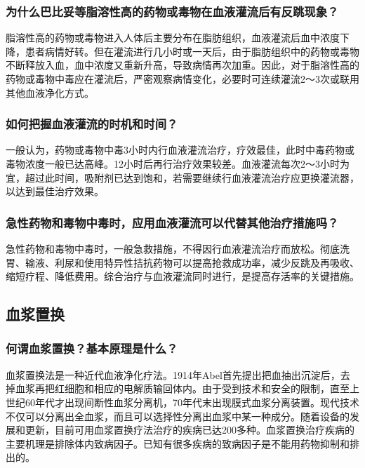 \subsubsection{为什么巴比妥等脂溶性高的药物或毒物在血液灌流后有反跳现象？}

脂溶性高的药物或毒物进入人体后主要分布在脂肪组织，血液灌流后血中浓度下降，患者病情好转。但在灌流进行几小时或一天后，由于脂肪组织中的药物或毒物不断释放入血，血中浓度又重新升高，导致病情再次加重。因此，对于脂溶性高的药物或毒物中毒应在灌流后，严密观察病情变化，必要时可连续灌流2～3次或联用其他血液净化方式。

\subsubsection{如何把握血液灌流的时机和时间？}

一般认为，药物或毒物中毒3小时内行血液灌流治疗，疗效最佳，此时中毒药物或毒物浓度一般已达高峰。12小时后再行治疗效果较差。血液灌流每次2～3小时为宜，超过此时间，吸附剂已达到饱和，若需要继续行血液灌流治疗应更换灌流器，以达到最佳治疗效果。

\subsubsection{急性药物和毒物中毒时，应用血液灌流可以代替其他治疗措施吗？}

急性药物和毒物中毒时，一般急救措施，不得因行血液灌流治疗而放松。彻底洗胃、输液、利尿和使用特异性拮抗药物可以提高抢救成功率，减少反跳及再吸收、缩短疗程、降低费用。综合治疗与血液灌流同时进行，是提高存活率的关键措施。

\subsection{血浆置换}

\subsubsection{何谓血浆置换？基本原理是什么？}

血浆置换法是一种近代血液净化疗法。1914年Abel首先提出把血抽出沉淀后，去掉血浆再把红细胞和相应的电解质输回体内。由于受到技术和安全的限制，直至上世纪60年代才出现间断性血浆分离机，70年代末出现膜式血浆分离装置。现代技术不仅可以分离出全血浆，而且可以选择性分离出血浆中某一种成分。随着设备的发展和更新，目前可用血浆置换疗法治疗的疾病已达200多种。血浆置换治疗疾病的主要机理是排除体内致病因子。已知有很多疾病的致病因子是不能用药物抑制和排出的。

